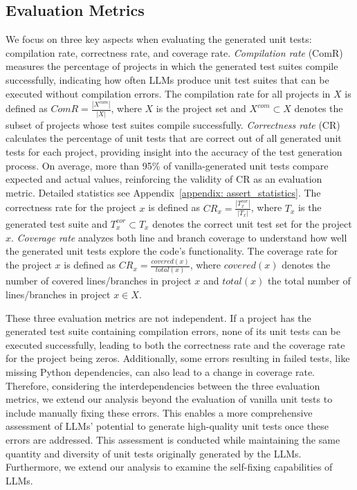 

\subsection{Evaluation Metrics}
\label{sec: evaluation}
We focus on three key aspects when evaluating the generated unit tests: compilation rate, correctness rate, and coverage rate.
\textit{Compilation rate} (ComR) measures the percentage of projects in which the generated test suites compile successfully, indicating how often LLMs produce unit test suites that can be executed without compilation errors. 
The compilation rate for all projects in $X$ is defined as 
$ComR = \frac{|X^{com}|}{|X|}$, 
where $X$ is the project set and $X^{com}\subset X$ denotes the subset of projects whose test suites compile successfully.
\textit{Correctness rate} (CR) calculates the percentage of unit tests that are correct out of all generated unit tests for each project, providing insight into the accuracy of the test generation process. On average, more than 95\% of vanilla-generated unit tests compare expected and actual values, reinforcing the validity of CR as an evaluation metric. Detailed statistics see Appendix~\ref{appendix: assert_statistics}.
The correctness rate for the project $x$ is defined as
$CR_x = \frac{|T_x^{cor}|}{|T_x|}$, 
where $T_x$ is the generated test suite and $T_x^{cor}\subset T_x$ denotes the correct unit test set for the project $x$.
\textit{Coverage rate} analyzes both line and branch coverage to understand how well the generated unit tests explore the code's functionality.
The coverage rate for the project $x$ is defined as
$CR_x = \frac{covered(x)}{total(x)}$,
where $covered(x)$ denotes the number of covered lines/branches in project $x$ and $total(x)$ the total number of lines/branches in project $x\in X$.


These three evaluation metrics are not independent. If a project has the generated test suite containing compilation errors, none of its unit tests can be executed successfully, leading to both the correctness rate and the coverage rate for the project being zeros. Additionally, some errors resulting in failed tests, like missing Python dependencies, can also lead to a change in coverage rate. Therefore, considering the interdependencies between the three evaluation metrics, we extend our analysis beyond the evaluation of vanilla unit tests to include manually fixing these errors. This enables a more comprehensive assessment of LLMs' potential to generate high-quality unit tests once these errors are addressed. This assessment is conducted while maintaining the same quantity and diversity of unit tests originally generated by the LLMs.
Furthermore, we extend our analysis to examine the self-fixing capabilities of LLMs.



